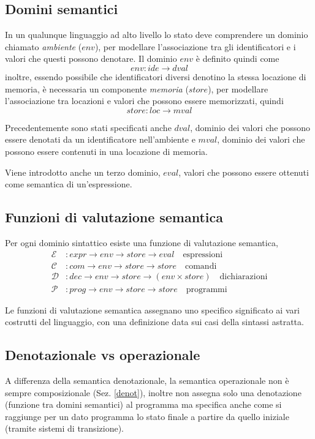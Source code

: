 \documentclass[a4paper, 10pt]{article}
\begin{document}
	\subsection{Domini semantici}
	In un qualunque linguaggio ad alto livello lo stato deve comprendere un dominio chiamato \textit{ambiente} ($env$), per modellare l'associazione tra gli identificatori e i valori che questi possono denotare. Il dominio $env$ è definito quindi come $$env:ide \to dval$$ inoltre, essendo possibile che identificatori diversi denotino la stessa locazione di memoria, è necessaria un componente \textit{memoria} ($store$), per modellare l'associazione tra locazioni e valori che possono essere memorizzati, quindi 
	\[
	store:loc \to mval
	\]
	
	Precedentemente sono stati specificati anche $dval$, dominio dei valori che possono essere denotati da un identificatore nell'ambiente e $mval$, dominio dei valori che possono essere contenuti in una locazione di memoria.
	
	Viene introdotto anche un terzo dominio, $eval$, valori che possono essere ottenuti come semantica di un'espressione.
	
	\subsection{Funzioni di valutazione semantica}
	Per ogni dominio sintattico esiste una funzione di valutazione semantica, 
	\begin{align*}
	\mathcal{E}&:expr \to env \to store \to eval \quad \text{espressioni} \\
	\mathcal{C}&:com \to env \to store \to store \quad \text{comandi} \\
	\mathcal{D}&:dec \to env \to store \to (env \times store) \quad \text{dichiarazioni} \\
	\mathcal{P}&:prog \to env \to store \to store \quad \text{programmi}
	\end{align*}
	
	
	Le funzioni di valutazione semantica assegnano uno specifico significato ai vari costrutti del linguaggio, con una definizione data sui casi della sintassi astratta.
	
	\subsection{Denotazionale vs operazionale}
	A differenza della semantica denotazionale, la semantica operazionale non è sempre composizionale (Sez. \ref{denot}), inoltre non assegna solo una denotazione (funzione tra domini semantici) al programma ma specifica anche come si raggiunge per un dato programma lo stato finale a partire da quello iniziale (tramite sistemi di transizione).
	
\end{document}
